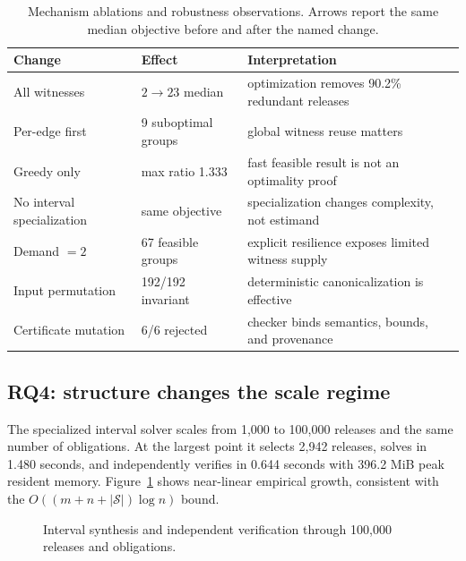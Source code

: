\documentclass[10pt,conference]{IEEEtran}
\newcommand{\Suit}{\mathcal{S}}
\newcommand{\tblfont}{\footnotesize}
\newcommand{\figsmall}{\rmfamily\footnotesize}
\begin{document}
\begin{table}[t]
\centering
\caption{Mechanism ablations and robustness observations. Arrows report the same median objective before and after the named change.}
\label{tab:ablation}
{\tblfont
\begin{tabularx}{\columnwidth}{@{}p{1.85cm}p{1.35cm}Y@{}}
\toprule
Change & Effect & Interpretation \\
\midrule
All witnesses & $2\rightarrow23$ median & optimization removes 90.2\% redundant releases \\
Per-edge first & 9 suboptimal groups & global witness reuse matters \\
Greedy only & max ratio 1.333 & fast feasible result is not an optimality proof \\
No interval specialization & same objective & specialization changes complexity, not estimand \\
Demand $=2$ & 67 feasible groups & explicit resilience exposes limited witness supply \\
Input permutation & 192/192 invariant & deterministic canonicalization is effective \\
Certificate mutation & 6/6 rejected & checker binds semantics, bounds, and provenance \\
\bottomrule
\end{tabularx}}
\end{table}

\subsection{RQ4: structure changes the scale regime}
The specialized interval solver scales from 1,000 to 100,000 releases and the same number of obligations. At the largest point it selects 2,942 releases, solves in 1.480 seconds, and independently verifies in 0.644 seconds with 396.2 MiB peak resident memory. Figure~\ref{fig:scale} shows near-linear empirical growth, consistent with the $O((m+n+|\Suit|)\log n)$ bound.

\begin{figure}[t]
\centering
{}
\caption{Interval synthesis and independent verification through 100,000 releases and obligations.}
\label{fig:scale}
\end{figure}
\end{document}
